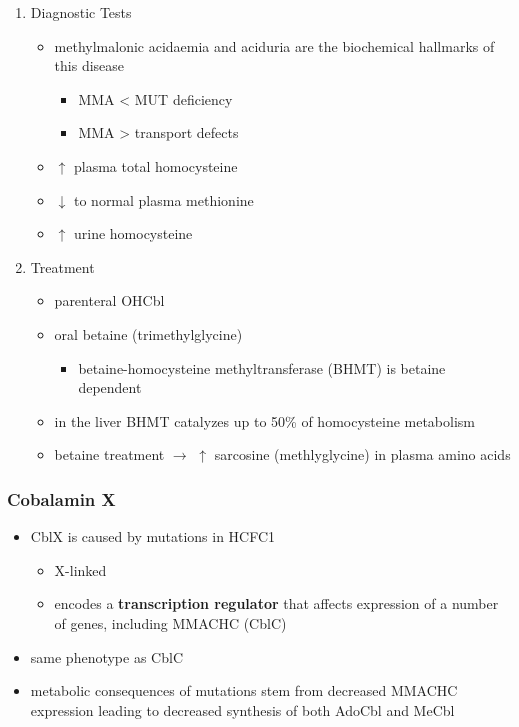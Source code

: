 \documentclass[12pt]{scrartcl}
\begin{document}
\begin{enumerate}
\item Diagnostic Tests
\label{sec:org7c8f65b}
\begin{itemize}
\item methylmalonic acidaemia and aciduria are the
biochemical hallmarks of this disease
\begin{itemize}
\item MMA \textless{} MUT deficiency
\item MMA \textgreater{} transport defects
\end{itemize}
\item \(\uparrow\) plasma total homocysteine
\item \(\downarrow\) to normal plasma methionine
\item \(\uparrow\) urine homocysteine
\end{itemize}

\item Treatment
\label{sec:org7d0fde7}
\begin{itemize}
\item parenteral OHCbl
\item oral betaine (trimethylglycine)
\begin{itemize}
\item betaine-homocysteine methyltransferase (BHMT) is betaine dependent
\end{itemize}
\end{itemize}


\begin{itemize}
\item in the liver BHMT catalyzes up to 50\% of homocysteine metabolism
\item betaine treatment \(\to\) \(\uparrow\) sarcosine (methlyglycine) in plasma amino acids
\end{itemize}
\end{enumerate}

\subsubsection{Cobalamin X}
\label{sec:org020359b}
\begin{itemize}
\item CblX is caused by mutations in HCFC1
\begin{itemize}
\item X-linked
\item encodes a \textbf{transcription regulator} that affects expression of a
number of genes, including MMACHC (CblC)
\end{itemize}
\item same phenotype as CblC
\item metabolic consequences of mutations stem from decreased MMACHC
expression leading to decreased synthesis of both AdoCbl and MeCbl
\end{itemize}
\end{document}
